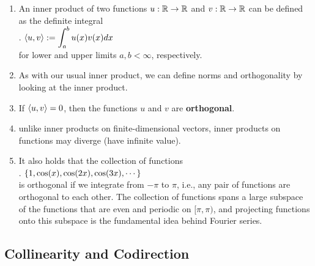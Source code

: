 \begin{enumerate}
    \item An inner product of two functions $u : \mathbb{R} \to \mathbb{R}$ and $v : \mathbb{R} \to \mathbb{R}$ can be defined as the definite integral
    \hfill \cite{mfml/book/mml/Deisenroth-Faisal-Ong}
    \\
    .\hfill
    $
        \langle u, v\rangle
        := \displaystyle\int^b_a u(x)v(x) dx
    $
    \hfill \cite{mfml/book/mml/Deisenroth-Faisal-Ong}
    \\
    for lower and upper limits $a, b < \infty$, respectively.
    \hfill \cite{mfml/book/mml/Deisenroth-Faisal-Ong}

    \item As with our usual inner product, we can define norms and orthogonality by looking at the inner product.
    \hfill \cite{mfml/book/mml/Deisenroth-Faisal-Ong}

    \item If $\langle u, v\rangle = 0$, then the functions $u$ and $v$ are \textbf{orthogonal}.
    \hfill \cite{mfml/book/mml/Deisenroth-Faisal-Ong}

    \item unlike inner products on finite-dimensional vectors, inner products on functions may diverge (have infinite value).
    \hfill \cite{mfml/book/mml/Deisenroth-Faisal-Ong}

    \item It also holds that the collection of functions
    \hfill \cite{mfml/book/mml/Deisenroth-Faisal-Ong}
    \\
    .\hfill
    $
        \left\{1, \cos(x), \cos(2x), \cos(3x), \cdots \right\}
    $
    \hfill \cite{mfml/book/mml/Deisenroth-Faisal-Ong}
    \\
    is orthogonal if we integrate from $-\pi$ to $\pi$, i.e., any pair of functions are orthogonal to each other.
    The collection of functions spans a large subspace of the functions that are even and periodic on $[\pi, \pi)$, and projecting functions onto this subspace is the fundamental idea behind Fourier series.
    \hfill \cite{mfml/book/mml/Deisenroth-Faisal-Ong}


\end{enumerate}










\subsection{Collinearity and Codirection}

